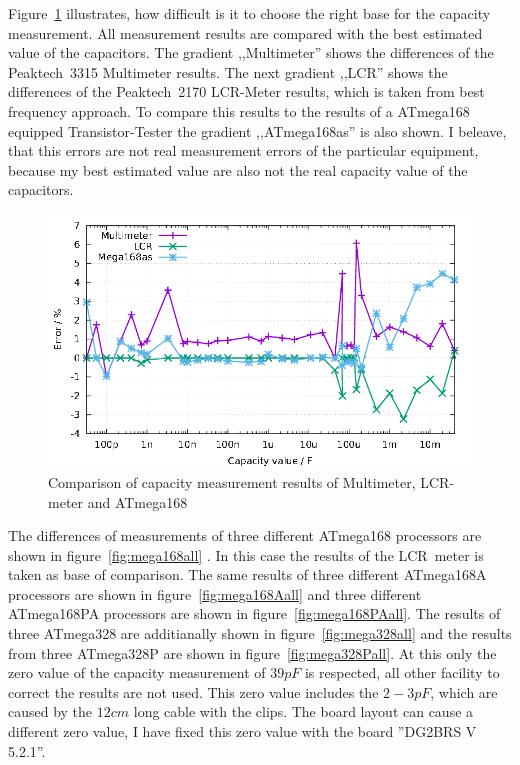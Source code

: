 Figure~\ref{fig:capcompare} illustrates, how difficult is it to choose the right base for the capacity measurement.
All measurement results are compared with the best estimated value of the capacitors.
The gradient ,,Multimeter'' shows the differences of the Peaktech~3315 Multimeter results.
The next gradient ,,LCR'' shows the differences of the Peaktech~2170 LCR-Meter results, which is taken from best frequency approach.
To compare this results to the results of a ATmega168 equipped Transistor-Tester the gradient ,,ATmega168as'' is also shown.
I beleave, that this errors are not real measurement errors of the particular equipment, because my best estimated value are
also not the real capacity value of the capacitors.

\begin{figure}[H]
\centering
\includegraphics[width=18cm]{../GNU/capcompare.pdf}
\caption{Comparison of capacity measurement results of Multimeter, LCR-meter and ATmega168}
\label{fig:capcompare}
\end{figure}

The differences of measurements of three different ATmega168 processors are shown in figure~\ref{fig:mega168all} .
In this case the results of the LCR~meter is taken as base of comparison.
The same results of three different ATmega168A processors are shown in figure~\ref{fig:mega168Aall} and
three different ATmega168PA processors are shown in figure~\ref{fig:mega168PAall}.
The results of three ATmega328 are additianally shown in figure~\ref{fig:mega328all} and the results from three
ATmega328P are shown in figure~\ref{fig:mega328Pall}.
At this only the zero value of the capacity measurement of \(39pF\) is respected, all other facility to correct the results are
not used.
This zero value includes the \(2-3pF\), which are caused by the \(12cm\) long cable with the clips.
The board layout can cause a different zero value, I have fixed this zero value with the board ''DG2BRS V 5.2.1''.

